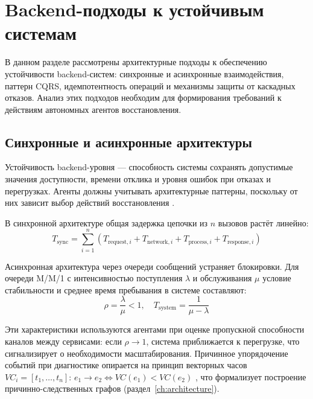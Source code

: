 \chapter{Backend-подходы к устойчивым системам}\label{ch:backend}

В данном разделе рассмотрены архитектурные подходы к обеспечению устойчивости backend-систем: синхронные и асинхронные взаимодействия, паттерн CQRS, идемпотентность операций и механизмы защиты от каскадных отказов. Анализ этих подходов необходим для формирования требований к действиям автономных агентов восстановления.

\section{Синхронные и асинхронные архитектуры}

Устойчивость backend-уровня --- способность системы сохранять допустимые значения доступности, времени отклика и уровня ошибок при отказах и перегрузках. Агенты должны учитывать архитектурные паттерны, поскольку от них зависит выбор действий восстановления \cite{russian_microservices}.

В синхронной архитектуре общая задержка цепочки из $n$ вызовов растёт линейно:
\begin{equation}
T_{\text{sync}} = \sum_{i=1}^{n} (T_{\text{request},i} + T_{\text{network},i} + T_{\text{process},i} + T_{\text{response},i})
\label{eq:sync_total_time}
\end{equation}

Асинхронная архитектура через очереди сообщений \cite{kleppmann_designing_data} устраняет блокировки. Для очереди M/M/1 с интенсивностью поступления $\lambda$ и обслуживания $\mu$ условие стабильности и среднее время пребывания в системе составляют:
\begin{equation}
\rho = \frac{\lambda}{\mu} < 1, \quad T_{\text{system}} = \frac{1}{\mu - \lambda}
\label{eq:queue_stability}
\end{equation}

Эти характеристики используются агентами при оценке пропускной способности каналов между сервисами: если $\rho \to 1$, система приближается к перегрузке, что сигнализирует о необходимости масштабирования. Причинное упорядочение событий при диагностике опирается на принцип векторных часов $VC_i = [t_1, \ldots, t_n]$: $e_1 \to e_2 \Leftrightarrow VC(e_1) < VC(e_2)$ \cite{lamport_distributed_systems}, что формализует построение причинно-следственных графов (раздел~\ref{ch:architecture}).


